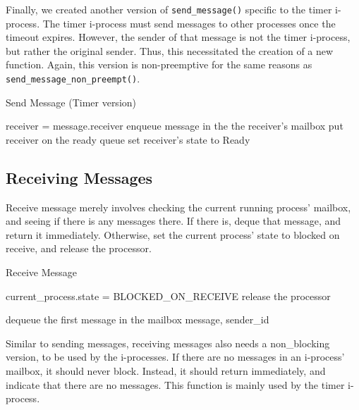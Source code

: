 \documentclass[12pt]{report}
\begin{document}
Finally, we created another version of \texttt{send_message()} specific to the timer i-process. The timer i-process must send messages to other processes once the timeout expires. However, the sender of that message is not the timer i-process, but rather the original sender. Thus, this necessitated the creation of a new function. Again, this version is non-preemptive for the same reasons as \texttt{send_message_non_preempt()}.

\begin{algorithm}[H]
	\caption{Send Message (Timer version)}
	\begin{algorithmic}[1]
			\State receiver = message.receiver
			\State enqueue message in the the receiver's mailbox
				\State put receiver on the ready queue
				\State set receiver's state to Ready
			\EndIf
		\EndFunction
	\end{algorithmic}
\end{algorithm}

\subsection{Receiving Messages}

Receive message merely involves checking the current running process' mailbox, and seeing if there is any messages there. If there is, deque that message, and return it immediately. Otherwise, set the current process' state to blocked on receive, and release the processor.

\begin{algorithm}[H]
	\caption{Receive Message}
	\begin{algorithmic}[1]
				\State current_process.state = BLOCKED_ON_RECEIVE
				\State release the processor
			\EndWhile

			\State dequeue the first message in the mailbox
			\State\Return message, sender_id
		\EndFunction
	\end{algorithmic}
\end{algorithm}

Similar to sending messages, receiving messages also needs a non_blocking version, to be used by the i-processes. If there are no messages in an i-process' mailbox, it should never block. Instead, it should return immediately, and indicate that there are no messages. This function is mainly used by the timer i-process.
\end{document}

